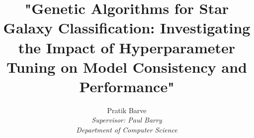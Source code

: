 

\title{"Genetic Algorithms for Star Galaxy Classification: Investigating the Impact of Hyperparameter Tuning on Model Consistency and Performance" \vspace{5cm}}
\author{Pratik Barve \\ \vspace{2cm} \textit{Supervisor: Paul Barry} \\ \textit{Department of Computer Science}}

\date{}

    \pagestyle{fancy}
    \renewcommand{\chaptermark}[1]{\markboth{#1}{#1}}
    \fancyhead[R]{}
    \fancyhead[L]{\itshape\chaptername\ \thechapter\ --\ \leftmark}

   
    
    
    
    
    
    \tableofcontents
    \thispagestyle{empty}
    
    \clearpage
    \listoffigures
    \clearpage
    \listoftables
    \clearpage
    
    
    
    
    
    
    

\pagebreak
{}


